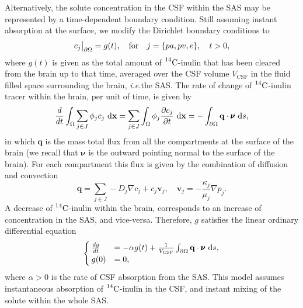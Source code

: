 \documentclass[10pt]{article}
\newcommand\restr[2]{{%
\left.\kern-\nulldelimiterspace %
#1 %
\vphantom{\big|} %
\right|_{#2} %
}}
\newcommand{\ie}{\emph{i.e.}\;}
\newcommand{\1}{^{(1)}}
\newcommand{\2}{^{(2)}}
\newcommand*{\dd}{\mathop{\kern0pt\mathrm{d}}\!{}}
\newcommand {\x}   {\mathbf{x}}
\newcommand{\Cinulin}{$\prescript{14}{}{\text{C}}$-inulin }
\begin{document}
Alternatively, the solute concentration in the CSF within the SAS may be represented by a time-dependent boundary condition. Still assuming instant absorption at the surface, we modify the Dirichlet boundary conditions to
\begin{equation}
     \restr{c_j}{\partial \Omega} =  g(t),\quad \text{for}\quad j=\{pa,pv,e \}, \quad t >0,
    \label{eq:inulin-inhomogeneous-dirichlet}
\end{equation}
where $ g(t)$ is given as the total amount of \Cinulin that has been cleared from the brain up to that time, averaged over the CSF volume $ V_\text{CSF} $ in the fluid filled space surrounding the brain, \ie the SAS. The rate of change of \Cinulin tracer within the brain, per unit of time, is given by
\begin{equation}
    \frac{d}{dt}\int_{\Omega} \sum_{j\in J} \phi_j c_j \,\dd \x= \sum_{j\in J} \int_{\Omega} \phi_j \frac{\partial c_j}{\partial t} \,\dd \x=   - \int_{\partial \Omega}  \mathbf{q} \cdot \pmb{\nu} \,\dd s  ,
\end{equation}
in which $\mathbf{q}$ is the mass total flux from all the compartments at the surface of the brain (we recall that $\pmb{\nu}$ is the outward pointing normal to the surface of the brain). 
For each compartment this flux is given by the combination of diffusion and convection 
\[
    \mathbf{q} =  \sum_{j\in J}  - D_j\nabla c_j + c_j \mathbf{v}_j,\quad \mathbf{v}_j = -\frac{\kappa_j}{\mu_j}\nabla p_j.   
\]
A decrease of \Cinulin within the brain, corresponds to an increase of concentration in the SAS, and vice-versa. Therefore, $g$ satisfies the linear ordinary differential equation 
\begin{equation}
    \begin{cases}
        \frac{dg}{dt} &= - \alpha g(t)  + \frac{1}{V_\text{CSF}} \int_{\partial \Omega}  \mathbf{q} \cdot\pmb{\nu}\,\dd s, \\
        g(0) &= 0,
    \end{cases}
    \label{eq:inulin-boundary-inhomogeneous}
\end{equation}
where $\alpha > 0$ is the rate of CSF absorption from the SAS. 
This model assumes instantaneous absorption of \Cinulin in the CSF, and instant mixing of the solute within the whole SAS. %
\end{document}
